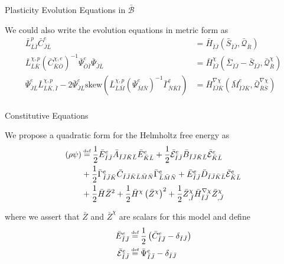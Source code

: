 \documentclass[11pt]{beamer}
\newcommand\defeq{\mathrel{\stackrel{\makebox[0pt]{\mbox{\normalfont\tiny def}}}{=}}}
\begin{document}
\begin{frame}{Plasticity Evolution Equations in $\bar{\mathcal{B}}$}

We could also write the evolution equations in metric form as
\begin{align*}
\bar{L}_{\bar{L}\bar{I}}^p \bar{C}_{\bar{J}\bar{L}}^e &= \bar{H}_{\bar{I}\bar{J}} \left(\bar{S}_{\bar{I}\bar{J}} ,\bar{\mathcal{Q}}_{\bar{R}}\right)\\
\bar{L}_{\bar{L}\bar{K}}^{\chi,p} \left(\bar{C}_{\bar{K}\bar{O}}^{\chi,e}\right)^{-1} \bar{\Psi}_{\bar{O}\bar{I}}^e\bar{\Psi}_{\bar{J}\bar{L}} &= \bar{H}_{\bar{I}\bar{J}}^{\chi}\left(\bar{\Sigma}_{\bar{I}\bar{J}} - \bar{S}_{\bar{I}\bar{J}},\bar{\mathcal{Q}}_{\bar{R}}^{\chi}\right)\\
\bar{\Psi}_{\bar{J}\bar{L}}^e\bar{L}_{\bar{L}\bar{K},\bar{I}}^{\chi,p}-2\bar{\Psi}_{\bar{J}\bar{L}}^e\text{skew}\left(\bar{L}_{\bar{L}\bar{M}}^{\chi,p}\left(\bar{\Psi}_{\bar{M}\bar{N}}^e\right)^{-1} \bar{\Gamma}_{\bar{N}\bar{K}\bar{I}}^e\right) &= \bar{H}_{\bar{I}\bar{J}\bar{K}}^{\nabla \chi}\left(\bar{M}_{\bar{I}\bar{J}\bar{K}}^e,\bar{\mathcal{Q}}_{\bar{R}\bar{S}}^{\nabla \chi}\right)\\
\end{align*}

\end{frame}

\begin{frame}{Constitutive Equations}

We propose a quadratic form for the Helmholtz free energy as
\begin{align*}
\left(\rho \psi \right) &\defeq \frac{1}{2} \bar{E}_{\bar{I}\bar{J}}^e \bar{A}_{\bar{I}\bar{J}\bar{K}\bar{L}} \bar{E}_{\bar{K}\bar{L}}^e + \frac{1}{2}\bar{\mathcal{E}}_{\bar{I}\bar{J}}^e \bar{B}_{\bar{I}\bar{J}\bar{K}\bar{L}} \bar{\mathcal{E}}_{\bar{K}\bar{L}}^e\\
&+\frac{1}{2}\bar{\Gamma}_{\bar{I}\bar{J}\bar{K}}^e\bar{C}_{\bar{I}\bar{J}\bar{K}\bar{L}\bar{M}\bar{N}} \bar{\Gamma}_{\bar{L}\bar{M}\bar{N}}^e + \bar{E}_{\bar{I}\bar{J}}^e \bar{D}_{\bar{I}\bar{J}\bar{K}\bar{L}} \bar{\mathcal{E}}_{\bar{K}\bar{L}}^e\\
&+ \frac{1}{2}\bar{H}\bar{Z}^2 + \frac{1}{2}\bar{H}^{\chi} \left(\bar{Z}^{\chi}\right)^2 + \frac{1}{2} \bar{Z}_{,\bar{I}}^{\chi} \bar{H}_{\bar{I}\bar{J}}^{\nabla \chi} \bar{Z}_{,\bar{J}}^{\chi}\\
\end{align*}

where we assert that $\bar{Z}$ and $\bar{Z}^{\chi}$ are scalars for this model and define
\begin{align*}
\bar{E}_{\bar{I}\bar{J}}^e &\defeq \frac{1}{2}\left(\bar{C}_{\bar{I}\bar{J}}^e - \delta_{\bar{I}\bar{J}}\right)\\
\bar{\mathcal{E}}_{\bar{I}\bar{J}}^e &\defeq \bar{\Psi}_{\bar{I}\bar{J}}^e - \delta_{\bar{I}\bar{J}}
\end{align*}

\end{frame}
\end{document}
